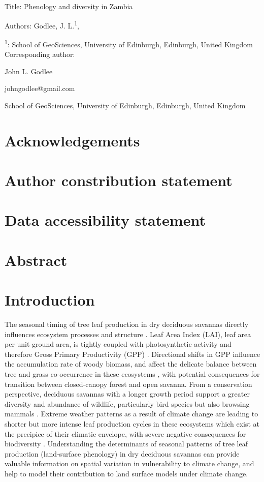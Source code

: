 \documentclass[11pt,a4paper]{article}
\begin{document}
{\Large{Title: Phenology and diversity in Zambia}}

Authors: Godlee, J. L.\textsuperscript{1}, 

\textsuperscript{1}: School of GeoSciences, University of Edinburgh, Edinburgh, United Kingdom \\

\vspace{1em}
Corresponding author:

John L. Godlee

johngodlee@gmail.com

School of GeoSciences, University of Edinburgh, Edinburgh, United Kingdom

\section*{Acknowledgements}

\section*{Author constribution statement}

\section*{Data accessibility statement}

\newpage{}
\linenumbers


\section*{Abstract}

\section{Introduction}

The seasonal timing of tree leaf production in dry deciduous savannas directly influences ecosystem processes and structure \citep{}. Leaf Area Index (LAI), leaf area per unit ground area, is tightly coupled with photosynthetic activity and therefore Gross Primary Productivity (GPP) \citep{}. Directional shifts in GPP influence the accumulation rate of woody biomass, and affect the delicate balance between tree and grass co-occurrence in these ecosystems \citep{}, with potential consequences for transition between closed-canopy forest and open savanna. From a conservation perspective, deciduous savannas with a longer growth period support a greater diversity and abundance of wildlife, particularly bird species but also browsing mammals \citep{}. Extreme weather patterns as a result of climate change are leading to shorter but more intense leaf production cycles in these ecosystems which exist at the precipice of their climatic envelope, with severe negative consequences for biodiversity \citep{}. Understanding the determinants of seasonal patterns of tree leaf production (land-surface phenology) in dry deciduous savannas can provide valuable information on spatial variation in vulnerability to climate change, and help to model their contribution to land surface models under climate change.
\end{document}
